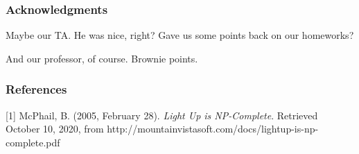 \documentclass{article} %
\begin{document}
\newpage

\subsubsection*{Acknowledgments}

Maybe our TA. He was nice, right? Gave us some points back on our homeworks?

And our professor, of course. Brownie points.

\subsubsection*{References}

\small{
[1] McPhail, B. (2005, February 28). \textit{Light Up is NP-Complete}. Retrieved October 10, 2020, from http://mountainvistasoft.com/docs/lightup-is-np-complete.pdf
}
\end{document}
